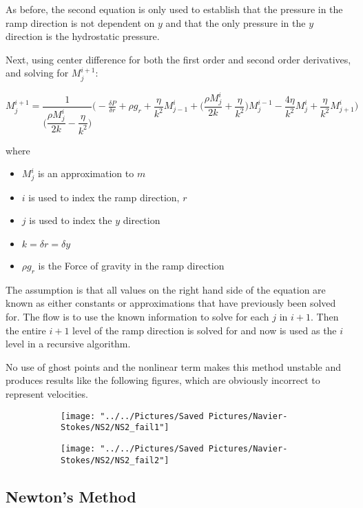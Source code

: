 \documentclass{article}
\begin{document}
	As before, the second equation is only used to establish that the pressure in the ramp direction is not dependent on $y$ and that the only pressure in the $y$ direction is the hydrostatic pressure.
	
	Next, using center difference for both the first order and second order derivatives, and solving for $M^{i+1}_{j}$:
	\begin{center}
		$M^{i+1}_{j}=\dfrac{1}{\Big(\dfrac{\rho M^{i}_{j}}{2k}-\dfrac{\eta}{k^{2}}\Big)}\Big(-\frac{\delta P}{\delta r}+\rho g_{r}+\dfrac{\eta}{k^{2}}M^i_{j-1}+\Big(\dfrac{\rho M^{i}_{j}}{2k}+\dfrac{\eta}{k^{2}}\Big)M^{i-1}_{j}-\dfrac{4\eta}{k^{2}}M^{i}_{j}+\dfrac{\eta}{k^{2}}M^{i}_{j+1}\Big)$
	\end{center}
	where 
	\begin{itemize}
	\item $M^{i}_{j}$ is an approximation to $m$
	\item$i$ is used to index the ramp direction, $r$ 
	\item$j$ is used to index the $y$ direction
	\item$k=\delta r=\delta y$
	\item$\rho g_r$ is the Force of gravity in the ramp direction
\end{itemize}
The assumption is that all values on the right hand side of the equation are known as either constants or approximations that have previously been solved for. The flow is to use the known information to solve for each $j$ in $i+1$. Then the entire $i+1$ level of the ramp direction is solved for and now is used as the $i$ level in a recursive algorithm. 

No use of ghost points and the nonlinear term makes this method unstable and produces results like the following figures, which are obviously incorrect to represent velocities.
\begin{figure}[h!]
\begin{subfigure}{0.4\linewidth}
	\centering
	\texttt{[image: "../../Pictures/Saved Pictures/Navier-Stokes/NS2/NS2\_fail1"]}
	\caption{}
	\label{fig:ns2fail1}
\end{subfigure}
\begin{subfigure}{0.4\linewidth}
	\centering
	\texttt{[image: "../../Pictures/Saved Pictures/Navier-Stokes/NS2/NS2\_fail2"]}
	\caption{}
	\label{fig:ns2fail2}
\end{subfigure}
\end{figure}


\subsection{Newton's Method}
\end{document}
